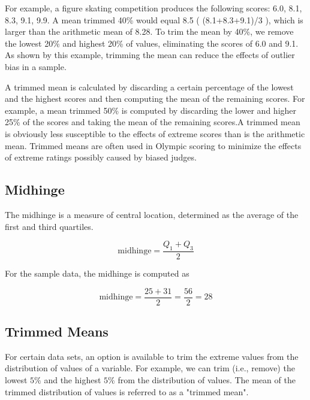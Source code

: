 \documentclass[]{report}
\begin{document}
	For example, a figure skating competition produces the following scores: 6.0, 8.1, 8.3, 9.1, 9.9. A mean trimmed 40\% would equal 8.5 ( (8.1+8.3+9.1)/3 ), which is larger than the arithmetic mean of 8.28. To trim the mean by 40\%, we remove the lowest 20\% and highest 20\% of values, eliminating the scores of 6.0 and 9.1. As shown by this example, trimming the mean can reduce the effects of outlier bias in a sample.
	
	A trimmed mean is calculated by discarding a certain percentage of the lowest and the highest scores and then computing the mean of the remaining scores. For example, a mean trimmed 50\% is computed by discarding the lower and higher 25\% of the scores and taking the mean of the remaining scores.A trimmed mean is obviously less susceptible to the effects of extreme scores than is the arithmetic mean. Trimmed means are often used in Olympic scoring to minimize the effects of extreme ratings possibly caused by biased judges.
	
	
	\subsection{Midhinge}

The midhinge is a measure of central location, determined as the average of the first and third quartiles.

\[  \mbox{midhinge} = \frac{Q_1 + Q_3}{2}\]

For the sample data, the midhinge is computed as

\[  \mbox{midhinge} = \frac{25 + 31}{2} = \frac{56}{2} = 28 \]


\subsection{Trimmed Means}

For certain data sets, an option is available to trim the extreme values from the distribution of values of a variable.
For example, we can trim (i.e., remove) the lowest $5\%$ and the highest $5\%$ from the distribution of values.
The mean of the trimmed distribution of values is referred to as a "trimmed mean".
\end{document}
